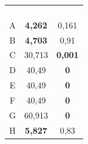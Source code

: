 \begin{table}[H]
\begin{subtable}{0.45\linewidth}
\begin{tabular}{@{}ccc@{}}
					& & \\
					& & \\
					& & \\
					& & \\ \midrule
					A & \textbf{4,262} & 0,161 \\
					B & \textbf{4,703} & 0,91 \\
					C & 30,713 & \textbf{0,001} \\
					D & 40,49 & \textbf{0} \\
					E & 40,49 & \textbf{0} \\
					F & 40,49 & \textbf{0} \\
					G & 60,913 & \textbf{0} \\
					H & \textbf{5,827} & 0,83 \\ \bottomrule
				\end{tabular}
		\end{subtable}
	
	
	\vspace{0.5cm}

\end{table}
